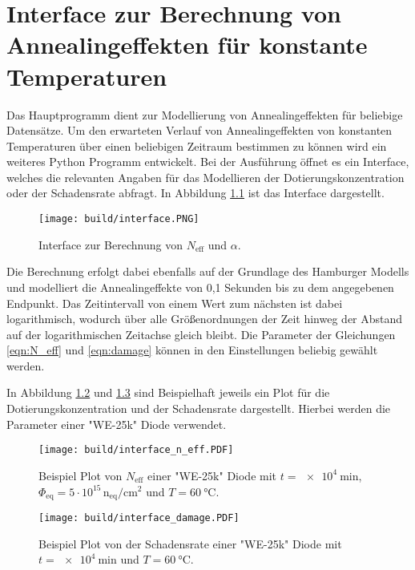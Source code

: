 \chapter{Interface zur Berechnung von Annealingeffekten für konstante Temperaturen}
Das Hauptprogramm dient zur Modellierung von Annealingeffekten für beliebige Datensätze.
Um den erwarteten Verlauf von Annealingeffekten von konstanten Temperaturen über einen
beliebigen Zeitraum bestimmen zu können wird ein weiteres Python Programm entwickelt.
Bei der Ausführung öffnet es ein Interface, welches die relevanten Angaben für
das Modellieren der Dotierungskonzentration oder der Schadensrate abfragt. In Abbildung \ref{fig:interface}
ist das Interface dargestellt.

\begin{figure}
  \centering
    \texttt{[image: build/interface.PNG]}
\caption{Interface zur Berechnung von $N_{\mathrm{eff}}$ und $\alpha$.}
\label{fig:interface}
\end{figure}

Die Berechnung erfolgt dabei ebenfalls auf der Grundlage des Hamburger Modells und modelliert die
Annealingeffekte von
0,1 Sekunden bis zu dem angegebenen Endpunkt.
Das Zeitintervall von einem Wert zum nächsten ist dabei logarithmisch, wodurch über alle
Größenordnungen der Zeit hinweg der Abstand auf der logarithmischen Zeitachse gleich bleibt.
Die Parameter der Gleichungen \ref{eqn:N_eff} und \ref{eqn:damage} können in den Einstellungen beliebig gewählt werden.

In Abbildung \ref{fig:inter_n} und \ref{fig:inter_damage} sind Beispielhaft jeweils ein Plot für die Dotierungskonzentration und der
Schadensrate dargestellt. Hierbei werden die Parameter einer "WE-25k" Diode verwendet.


\begin{figure}
  \centering
  \texttt{[image: build/interface\_n\_eff.PDF]}
  \caption{Beispiel Plot von $N_{\mathrm{eff}}$ einer "WE-25k" Diode mit $t = \SI{e4}{\minute}$, $\Phi_{\mathrm{eq}}= 5\cdot 10^{15} \, \mathrm{n_{eq}/cm^2}$ und $T=\SI{60}{\celsius}$.}
  \label{fig:inter_n}
\end{figure}

\begin{figure}
  \centering
  \texttt{[image: build/interface\_damage.PDF]}
  \caption{Beispiel Plot von der Schadensrate einer "WE-25k" Diode mit $t = \SI{e4}{\minute}$ und $T=\SI{60}{\celsius}$.}
  \label{fig:inter_damage}
\end{figure}
